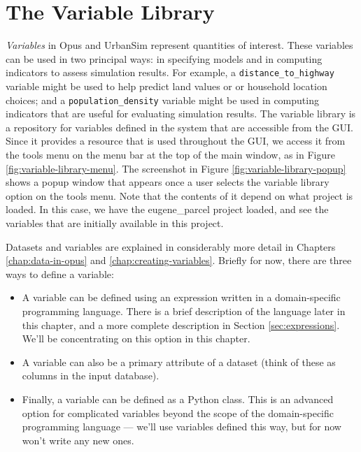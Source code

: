 \chapter{The Variable Library}
\label{chap:variable-library}

\emph{Variables} in Opus and UrbanSim represent quantities of interest.
These variables can be used in two principal ways: in specifying models and
in computing indicators to assess simulation results.  For example, a
\mbox{\tt distance\_to\_highway} variable might be used to help predict land
values or or household location choices; and a \mbox{\tt population\_density}
variable might be used in computing indicators that are useful for
evaluating simulation results.  The variable library is a repository for
variables defined in the system that are accessible from the GUI\@.  Since
it provides a resource that is used throughout the GUI, we access it from
the tools menu on the menu bar at the top of the main window, as in Figure
\ref{fig:variable-library-menu}.  The screenshot in Figure
\ref{fig:variable-library-popup} shows a popup window that appears once a
user selects the variable library option on the tools menu.  Note that the
contents of it depend on what project is loaded.  In this case, we have the
eugene\_parcel project loaded, and see the variables that are initially
available in this project.

Datasets and variables are explained in considerably more detail in
Chapters \ref{chap:data-in-opus} and \ref{chap:creating-variables}.
Briefly for now, there are three ways to define a variable:

\begin{itemize}

\item A variable can be defined using an expression written in a
  domain-specific programming language.  There is a brief description of
  the language later in this chapter, and a more complete description in
  Section \ref{sec:expressions}.  We'll be concentrating on this option in
  this chapter.

\item A variable can also be a primary attribute of a dataset (think of
  these as columns in the input database).

\item Finally, a variable can be defined as a Python class.  This is an
  advanced option for complicated variables beyond the scope of the
  domain-specific programming language --- we'll use variables defined this
  way, but for now won't write any new ones.

\end{itemize}

